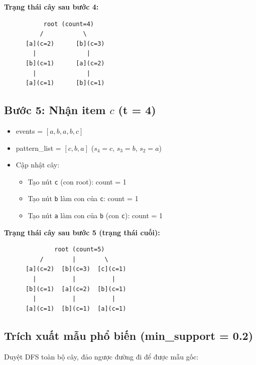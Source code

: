 \documentclass[a4paper,12pt]{report}
\begin{document}
\textbf{Trạng thái cây sau bước 4:}
\begin{verbatim}
           root (count=4)
          /           \
      [a](c=2)      [b](c=3)
        |              |
      [b](c=1)      [a](c=2)
        |              |
      [a](c=1)      [b](c=1)
\end{verbatim}

\subsection{Bước 5: Nhận item $c$ (t = 4)}

\begin{itemize}
    \item events = $[a, b, a, b, c]$
    \item pattern\_list = $[c, b, a]$ ($s_4=c$, $s_3=b$, $s_2=a$)
    \item Cập nhật cây:
    \begin{itemize}
        \item Tạo nút \texttt{c} (con root): count = 1
        \item Tạo nút \texttt{b} làm con của \texttt{c}: count = 1
        \item Tạo nút \texttt{a} làm con của \texttt{b} (con \texttt{c}): count = 1
    \end{itemize}
\end{itemize}

\textbf{Trạng thái cây sau bước 5 (trạng thái cuối):}
\begin{verbatim}
              root (count=5)
          /        |        \
      [a](c=2)  [b](c=3)  [c](c=1)
        |          |          |
      [b](c=1)  [a](c=2)  [b](c=1)
        |          |          |
      [a](c=1)  [b](c=1)  [a](c=1)
\end{verbatim}

\subsection{Trích xuất mẫu phổ biến (min\_support = 0.2)}

Duyệt DFS toàn bộ cây, đảo ngược đường đi để được mẫu gốc:
\end{document}
